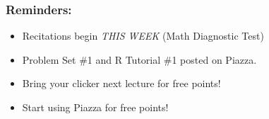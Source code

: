 \documentclass[handout]{beamer}
\begin{document}

\begin{frame}
\frametitle{Reminders:}
\begin{itemize}
	\item Recitations begin \emph{THIS WEEK} (Math Diagnostic Test)
	\item Problem Set \#1 and R Tutorial \#1 posted on Piazza.
	\item Bring your clicker next lecture for free points!
	\item Start using Piazza for free points!
\end{itemize}
\end{frame}
\end{document}

